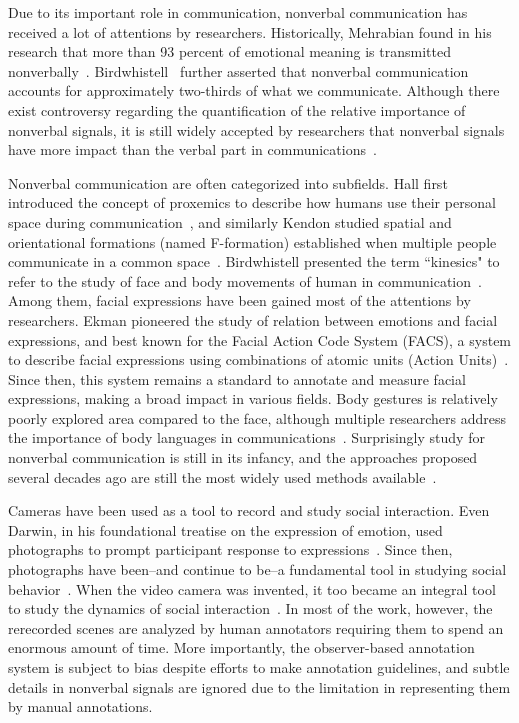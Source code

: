 Due to its important role in communication, nonverbal communication has received a lot of attentions by researchers. Historically, Mehrabian found in his research that more than 93 percent of emotional meaning is transmitted nonverbally~\cite{Mehrabian67,Mehrabian81}. Birdwhistell~\cite{Birdwhistell70} further asserted that nonverbal communication accounts for approximately two-thirds of what we communicate. Although there exist controversy regarding the quantification of the relative importance of nonverbal signals, it is still widely accepted by researchers that nonverbal signals have more impact than the verbal part in communications~\cite{Moore13}.

Nonverbal communication are often categorized into subfields. Hall first introduced the concept of proxemics to describe how humans use their personal space during communication~\cite{Hall66}, and similarly Kendon studied spatial and orientational formations (named F-formation) established when multiple people communicate in a common space~\cite{kendon90}. Birdwhistell presented the term ``kinesics" to refer to the study of face and body movements of human in communication~\cite{Birdwhistell52, ekman1969}. Among them, facial expressions have been gained most of the attentions by researchers. Ekman pioneered the study of relation between emotions and facial expressions, and best known for the Facial Action Code System (FACS), a system to describe facial expressions using combinations of atomic units (Action Units)~\cite{ekman1977facial}. Since then, this system remains a standard to annotate and measure facial expressions, making a broad impact in various fields. Body gestures is relatively poorly explored area compared to the face, although multiple researchers address the importance of body languages in communications~\cite{Gelder09, Moore13, Meeren-2005, Aviezer-2012}. Surprisingly study for nonverbal communication is still in its infancy, and the approaches proposed several decades ago are still the most widely used methods available~\cite{Moore13}. 

Cameras have been used as a tool to record and study social interaction. Even Darwin, in his foundational treatise on the expression of emotion, used photographs to prompt participant response to expressions~\cite{Darwin-1872}. Since then, photographs have been--and continue to be--a fundamental tool in studying social behavior~\cite{Hall-1962,Izard-1971,Ekman-1977}. When the video camera was invented, it too became an integral tool to study the dynamics of social interaction~\cite{Muybridge-1887,Yarbus-1967}. In most of the work, however, the rerecorded scenes are analyzed by human annotators requiring them to spend an enormous amount of time. More importantly, the observer-based annotation system is subject to bias despite efforts to make annotation guidelines, and subtle details in nonverbal signals are ignored due to the limitation in representing them by manual annotations. 

